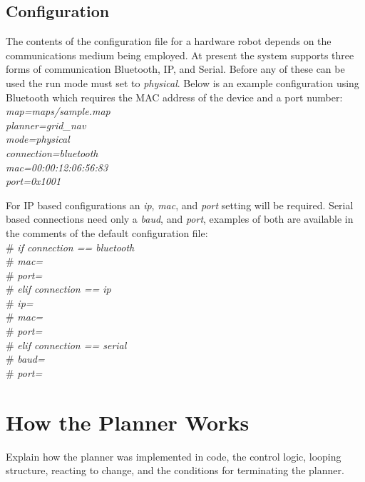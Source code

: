 \subsection{Configuration}
\noindent
The contents of the configuration file for a hardware robot depends on the communications medium being employed. At present the system supports three forms of communication Bluetooth, IP, and Serial. Before any of these can be used the run mode must set to \textit{physical}. Below is an example configuration using Bluetooth which requires the MAC address of the device and a port number: \\

	\indent \textit{map=maps/sample.map\\}
	\indent \textit{planner=grid\_nav\\}
	\indent \textit{mode=physical\\}
	\indent \textit{connection=bluetooth\\}
	\indent \textit{mac=00:00:12:06:56:83\\}
	\indent \textit{port=0x1001}
	
\noindent 
For IP based configurations an \textit{ip}, \textit{mac}, and \textit{port} setting will be required. Serial based connections need only a \textit{baud}, and \textit{port}, examples of both are available in the comments of the default configuration file: \\

	\indent \#   	\textit{if connection == bluetooth\\}
	\indent \#		\indent \textit{mac=\\}
	\indent \#      \indent \textit{port=\\}
	\indent \#   	\textit{elif connection == ip\\}
	\indent \#      \indent \textit{ip=\\}
	\indent \#      \indent \textit{mac=\\}
	\indent \#      \indent \textit{port=\\}
	\indent \#   	\textit{elif connection == serial\\}
	\indent \#      \indent \textit{baud=\\}
	\indent \#      \indent \textit{port=}


\newpage

\section{How the Planner Works}
Explain how the planner was implemented in code, the control logic, looping structure, reacting to change, and the conditions for terminating the planner.

